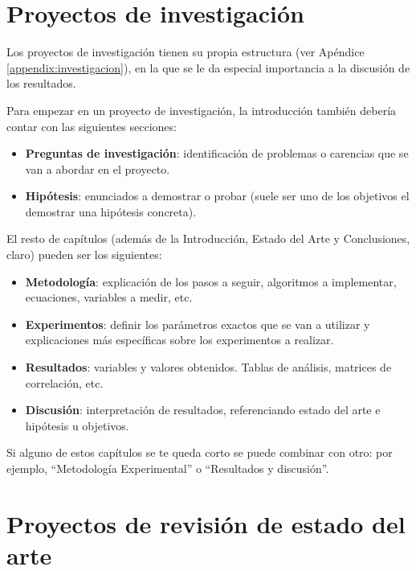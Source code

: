 \section{Proyectos de investigación}
Los proyectos de investigación tienen su propia estructura (ver Apéndice \ref{appendix:investigacion}), en la que se le da especial importancia a la discusión de los resultados. 

Para empezar en un proyecto de investigación, la introducción también debería contar con las siguientes secciones:
    \begin{itemize}
                \item \textbf{Preguntas de investigación}: identificación de problemas o carencias que se van a abordar en el proyecto.
                \item \textbf{Hipótesis}: enunciados a demostrar o probar (suele ser uno de los objetivos el demostrar una hipótesis concreta).
                
    \end{itemize}

El resto de capítulos (además de la Introducción, Estado del Arte y Conclusiones, claro) pueden ser los siguientes:
\begin{itemize}
    \item \textbf{Metodología}: explicación de los pasos a seguir, algoritmos a implementar, ecuaciones, variables a medir, etc.
    \item \textbf{Experimentos}: definir los parámetros exactos que se van a utilizar y explicaciones más específicas sobre los experimentos a realizar.
    \item \textbf{Resultados}: variables y valores obtenidos. Tablas de análisis, matrices de correlación, etc.
    \item \textbf{Discusión}: interpretación de resultados, referenciando estado del arte e hipótesis u objetivos.
\end{itemize}
    
Si alguno de estos capítulos se te queda corto se puede combinar con otro: por ejemplo, ``Metodología Experimental'' o ``Resultados y discusión''.
        
\section{Proyectos de revisión de estado del arte} 

